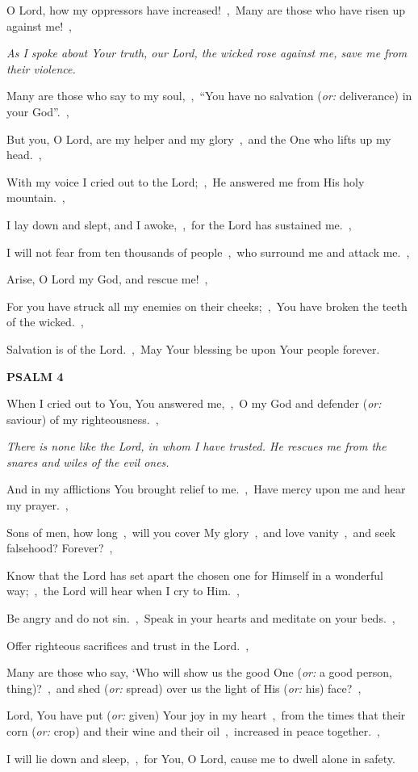 \documentclass[12pt,twoside,a5paper]{article}
\newcommand{\psalm}[1]{\textbf{PSALM {#1}}}
\newcommand{\qanona}[1]{{\liturgicalhint{Qanona.} \emph{#1}}}
\newcommand{\translationoption}[1]{\emph{or:} #1}
\begin{document}
\begin{normalparskip}
  O Lord, how my oppressors have increased!~\sep\ Many are those who have risen up against me!~\sep

  \qanona{As I spoke about Your truth, our Lord, the wicked rose against me, save me from their violence.}

  Many are those who say to my soul,~\sep\ ``You have no salvation (\translationoption{deliverance}) in your God''.~\sep

  But you, O Lord, are my helper and my glory~\sep\ and the One who lifts up my head.~\sep

  With my voice I cried out to the Lord;~\sep\ He answered me from His holy mountain.~\sep

  I lay down and slept, and I awoke,~\sep\ for the Lord has sustained me.~\sep

  I will not fear from ten thousands of people~\sep\ who surround me and attack me.~\sep

  Arise, O Lord my God, and rescue me!~\sep

  For you have struck all my enemies on their cheeks;~\sep\ You have broken the teeth of the wicked.~\sep

  Salvation is of the Lord.~\sep\ May Your blessing be upon Your people forever.
\end{normalparskip}

\psalm{4}

\begin{normalparskip}
  When I cried out to You, You answered me,~\sep\ O my God and defender (\translationoption{saviour}) of my righteousness.~\sep

  \qanona{There is none like the Lord, in whom I have trusted. He rescues me from the snares and wiles of the evil ones.}

  And in my afflictions You brought relief to me.~\sep\ Have mercy upon me and hear my prayer.~\sep

  Sons of men, how long~\sep\ will you cover My glory~\sep\ and love vanity~\sep\ and seek falsehood? Forever?~\sep

  Know that the Lord has set apart the chosen one for Himself in a wonderful way;~\sep\ the Lord will hear when I cry to Him.~\sep

  Be angry and do not sin.~\sep\ Speak in your hearts and meditate on your beds.~\sep

  Offer righteous sacrifices and trust in the Lord.~\sep

  Many are those who say, ‘Who will show us the good One (\translationoption{a good person, thing})?~\sep\ and shed (\translationoption{spread}) over us the light of His (\translationoption{his}) face?~\sep

  Lord, You have put (\translationoption{given}) Your joy in my heart~\sep\ from the times that their corn (\translationoption{crop}) and their wine and their oil~\sep\ increased in peace together.~\sep

  I will lie down and sleep,~\sep\ for You, O Lord, cause me to dwell alone in safety.
\end{normalparskip}
\end{document}
